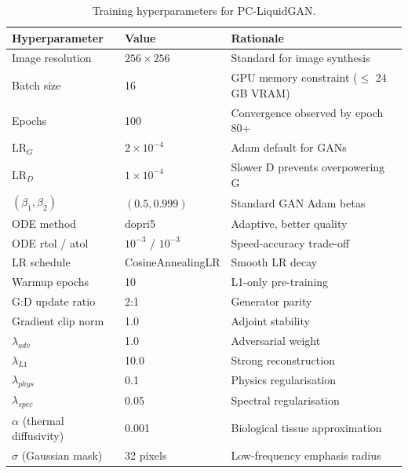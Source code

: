 \begin{table}[htbp]
\centering
\caption{Training hyperparameters for PC-LiquidGAN.}
\label{tab:hyperparams}
\begin{tabular}{lll}
\toprule
\textbf{Hyperparameter} & \textbf{Value} & \textbf{Rationale} \\
\midrule
Image resolution & $256 \times 256$ & Standard for image synthesis \\
Batch size & 16 & GPU memory constraint ($\leq$ 24 GB VRAM) \\
Epochs & 100 & Convergence observed by epoch 80+ \\
$\text{LR}_G$ & $2 \times 10^{-4}$ & Adam default for GANs \\
$\text{LR}_D$ & $1 \times 10^{-4}$ & Slower D prevents overpowering G \\
$(\beta_1, \beta_2)$ & $(0.5, 0.999)$ & Standard GAN Adam betas \\
ODE method & dopri5 & Adaptive, better quality \\
ODE rtol / atol & $10^{-3}$ / $10^{-3}$ & Speed-accuracy trade-off \\
LR schedule & CosineAnnealingLR & Smooth LR decay \\
Warmup epochs & 10 & L1-only pre-training \\
G:D update ratio & 2:1 & Generator parity \\
Gradient clip norm & 1.0 & Adjoint stability \\
$\lambda_{adv}$ & 1.0 & Adversarial weight \\
$\lambda_{L1}$ & 10.0 & Strong reconstruction \\
$\lambda_{phys}$ & 0.1 & Physics regularisation \\
$\lambda_{spec}$ & 0.05 & Spectral regularisation \\
$\alpha$ (thermal diffusivity) & 0.001 & Biological tissue approximation \\
$\sigma$ (Gaussian mask) & 32 pixels & Low-frequency emphasis radius \\
\bottomrule
\end{tabular}
\end{table}